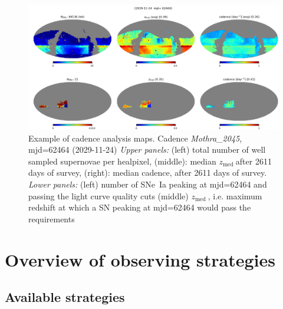 \documentclass [11pt,a4paper]{article}
\newcommand{\zmed}{$z_{\mathrm{med}}\ $}
\begin{document}
\begin{figure}
    \begin{center}
      \includegraphics[width=\linewidth]{Figures/mothra_2045_02611.png}
      \caption{Example of cadence analysis maps.  Cadence {\em
          Mothra\_2045}, mjd=62464 (2029-11-24) {\em Upper panels:}
        (left) total number of well sampled supernovae per healpixel,
        (middle): median \zmed after 2611 days of survey, (right):
        median cadence, after 2611 days of survey. {\em Lower panels:}
        (left) number of SNe~Ia peaking at mjd=62464 and passing the
        light curve quality cuts (middle) \zmed, i.e.  maximum
        redshift at which a SN peaking at mjd=62464 would pass the
        requirements}
    \end{center}
\end{figure}


\section{Overview of observing strategies}

\subsection{Available strategies}
\end{document}
